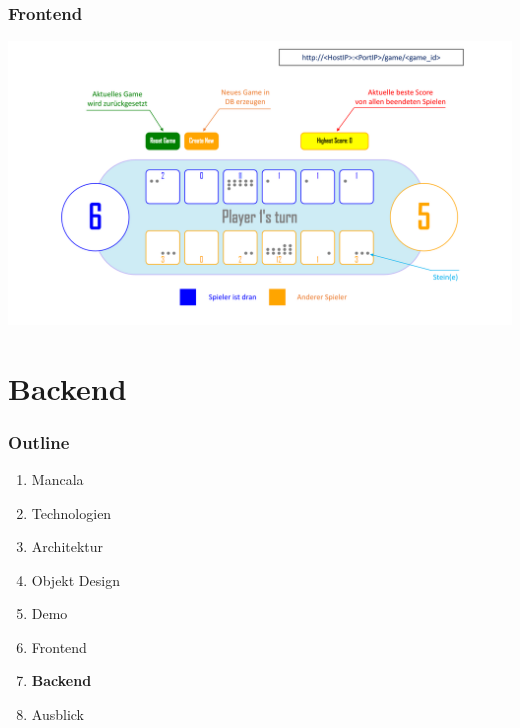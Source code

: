 \documentclass[
	10pt,
	t		%
]{beamer}
\begin{document}
\begin{frame}
\frametitle{Frontend}
\begin{center}
\includegraphics[scale=0.32]{./pictures/GUI_Explanation.pdf}
\end{center}
\end{frame}

\section{Backend}
\begin{frame}
\frametitle{Outline}
\begin{enumerate}
\item Mancala
\item Technologien
\item Architektur
\item Objekt Design
\item Demo
\item Frontend
\item \textbf{Backend}
\item Ausblick
\end{enumerate}
\end{frame}
\end{document}
